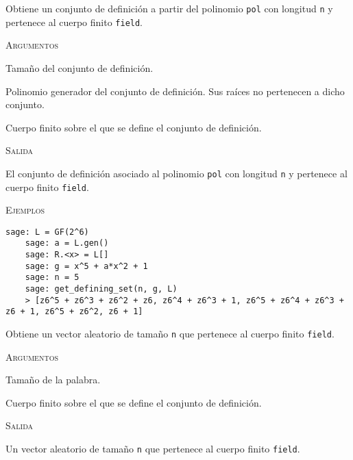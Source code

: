 \begin{description}[leftmargin=1em, font=\normalfont\ttfamily, style=nextline]
  \item[get\_defining\_set(n, pol, field)] Obtiene un conjunto de definición a partir del polinomio \texttt{pol} con longitud \texttt{n} y pertenece al cuerpo finito \texttt{field}.

  \textsc{Argumentos}
  \begin{description}[font=\normalfont\ttfamily]
    \item[n] Tamaño del conjunto de definición.
    \item[pol] Polinomio generador del conjunto de definición. Sus raíces no pertenecen a dicho conjunto.
    \item[field] Cuerpo finito sobre el que se define el conjunto de definición.
  \end{description}

  \textsc{Salida}
  \begin{description}[font=\normalfont\ttfamily]
    \item[] El conjunto de definición asociado al polinomio \texttt{pol} con longitud \texttt{n} y pertenece al cuerpo finito \texttt{field}.
  \end{description}

  \textsc{Ejemplos}
  \begin{lstlisting}[gobble=4]
    sage: L = GF(2^6)
    sage: a = L.gen()
    sage: R.<x> = L[]
    sage: g = x^5 + a*x^2 + 1
    sage: n = 5
    sage: get_defining_set(n, g, L)
    > [z6^5 + z6^3 + z6^2 + z6, z6^4 + z6^3 + 1, z6^5 + z6^4 + z6^3 + z6 + 1, z6^5 + z6^2, z6 + 1]
  \end{lstlisting}

  \item[random\_word(n, field)] Obtiene un vector aleatorio de tamaño \texttt{n} que pertenece al cuerpo finito \texttt{field}.

  \textsc{Argumentos}
  \begin{description}[font=\normalfont\ttfamily]
    \item[n] Tamaño de la palabra.
    \item[field] Cuerpo finito sobre el que se define el conjunto de definición.
  \end{description}

  \textsc{Salida}
  \begin{description}[font=\normalfont\ttfamily]
    \item[] Un vector aleatorio de tamaño \texttt{n} que pertenece al cuerpo finito \texttt{field}.
  \end{description}


\end{description}
